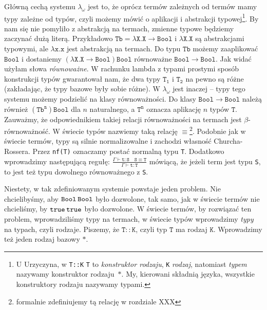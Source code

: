\documentclass[11pt,leqno]{article}
\begin{document}
Główną cechą systemu $\lambda_{\omega}$ jest to, że oprócz termów zależnych od termów mamy typy zależne od typów, czyli możemy mówić o aplikacji i abstrakcji typowej\footnote{U Urzyczyna, w \texttt{T::K} \; \texttt{T} to \textit{konstruktor rodzaju}, \texttt{K} \textit{rodzaj}, natomiast \textit{typem} nazywamy konstruktor rodzaju~$\ast$. My, kierowani składnią języka, wszystkie konstruktory rodzaju nazywamy typami.}. By nam się nie pomyliło z abstrakcją na termach, zmienne typowe będziemy zaczynać dużą literą. Przykładowo $\mathtt{Tb=\lambda X.X \rightarrow Bool}$ i $\mathtt{\lambda X.X}$ są abstrakcjami typowymi, ale $\mathtt{\lambda x.x}$ jest abstrakcją na termach. 
Do typu $\mathtt{Tb}$ możemy zaaplikować $\mathtt{Bool}$ i dostaniemy $\mathtt{(\lambda X.X \rightarrow Bool)Bool}$ równoważne $\mathtt{Bool \rightarrow Bool}$. Jak widać użyłam słowa \textit{równoważne}. W rachunku lambda z typami prostymi sposób konstrukcji typów gwarantował nam, że dwa typy $\mathtt{T_1}$ i $\mathtt{T_2}$ na pewno są różne (zakładając, że typy bazowe były sobie różne). W $\lambda_{\omega}$ jest inaczej -- typy tego systemu możemy podzielić na klasy równoważności. Do klasy $\mathtt{Bool \rightarrow Bool}$ należą również $\mathtt{ (Tb^n) Bool }$ dla $n$ naturalnego, a $\mathtt{T^n}$ oznacza aplikację $n$ typów $\mathtt{T}$.
Zauważmy, że odpowiednikiem takiej relacji równoważności na termach jest $\beta$-równoważność. W świecie typów nazwiemy taką relację $\equiv$\footnote{formalnie zdefiniujemy tą relację w rozdziale XXX}. Podobnie jak w świecie termów, typy są silnie normalizowalne i zachodzi własność Churcha-Rossera. Przez \texttt{nf(T)} oznaczamy postać normalną typu \texttt{T}.
Dodatkowo wprowadzimy następującą regułę:
$\mathtt{\frac{\Gamma \vdash t:S \hspace{1em} S\equiv T  }{\Gamma \vdash t:T}}$
mówiącą, że jeżeli term jest typu \texttt{S}, to jest też typu dowolnego równoważnego z \texttt{S}.  

Niestety, w tak zdefiniowanym systemie powstaje jeden problem. Nie chcielibyśmy, aby $\mathtt{Bool \hspace{0.2em} Bool}$ było dozwolone, tak samo, jak w świecie termów nie chcieliśmy, by $\mathtt{true \hspace{0.2em} true}$ było dozwolone. W świecie termów, by rozwiązać ten problem, wprowadziliśmy typy na termach, w świecie typów wprowadzimy \textit{typy} na typach, czyli rodzaje. Piszemy, że $\mathtt{T::K}$, czyli typ $\mathtt{T}$ ma rodzaj $\mathtt{K}$. Wprowadzimy też jeden rodzaj bazowy $\mathtt{\ast}$.
\end{document}
